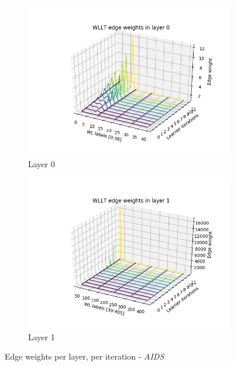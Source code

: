 		
		\begin{figure}[H]
			\centering	
			\begin{subfigure}{0.45\textwidth}
				\centering
				\includegraphics[width=1.1\linewidth]{images/plotA2_WLLTL0_AIDS_GDL_24_17h-05}
				\caption{Layer 0}
				\label{fig:plota2wlltl0aidsgdl2417h-05}
			\end{subfigure}
			\begin{subfigure}{0.45\textwidth}
				\centering
				\includegraphics[width=1.1\linewidth]{images/plotA2_WLLTd1_AIDS_GDL_24_17h-05}
				\caption{Layer 1}
				\label{fig:plota2wlltd1aidsgdl2417h-05}
			\end{subfigure}
			\caption{Edge weights per layer, per iteration - \textit{AIDS}}
			\label{fig:EWWireframe_AIDS}
		\end{figure} 
		

